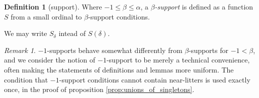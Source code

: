 \documentclass[112pt]{article}
\theoremstyle{definition}
\newtheorem{definition}[theorem]{Definition}
\theoremstyle{remark}
\newtheorem{remark}[theorem]{Remark}
\begin{document}
\begin{definition}[support]\label{def:support}
Where $-1\leq\beta \leq \alpha$, a {\em $\beta$-support\/} is defined as a function $S$ from a small ordinal to $\beta$-support conditions.

We may write $S_\delta$ intead of $S(\delta)$.
\end{definition}

{
\begin{remark}
 $-1$-supports behave somewhat differently from $\beta$-supports for $-1 < \beta$, and we consider the notion of $-1$-support to be merely a technical convenience, often making the statements of definitions and lemmas more uniform.
  The condition that $-1$-support conditions cannot contain near-litters is used exactly once, in the proof of proposition \ref{prop:unions_of_singletons}.
\end{remark}
}

\begin{comment}

We make the formal requirement on supports
that if the range of a support contains $(x,A)$ and $(y,A)$ where $x,y$ are typed near-litters and either $(x \Delta y)\cap \tau_{-1}$ or $(x \cap y) \cap \tau_{-1}$ is small, that all $(z,A)$ with $z\cap \tau_{-1}$ a singleton subset of this small set are included in the range of the support.

For any supports $S$ and $T$ we denote by $S+T$ a support which consists
of $S$, followed by $T$, followed by the atoms which need to be added to make this a support (to make it satisfy the additional condition):  what this means is that $(S+T)_\epsilon = S(\epsilon)$ [which we write $S_\epsilon$] for $\epsilon$ in the domain of $S$, $(S+T)_{{\tt dom}(S)+\epsilon} = T_\epsilon$ for $\epsilon$ in the domain of $T$, and the rest of the range of $S+T$ consists of the support conditions with atomic first component  which must be added to satisfy the additional condition [this is not uniquely determined:  supports usually have many possible sums because the needed additional conditions can be added in any order.]
\end{comment}
\end{document}
